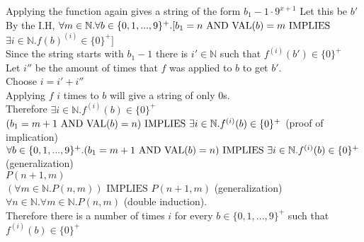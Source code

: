 \documentclass[11pt]{article}
\newcommand{\Implies}{\mbox{ IMPLIES }}
\newcommand{\And}{\mbox{ AND }}
\def\nats{{\mathbb N}}
\begin{document}
\begin{enumerate}
\begin{solution}
    \null\qquad\qquad Applying the function again gives a string of the form $b_1-1\cdot 9^{x+1}$ Let this be $b'$\\
    \null\qquad\qquad By the I.H, $\forall m\in\nats.\forall b\in\{0,1,...,9\}^+.[b_1 = n \And {\rm VAL}(b) = m\Implies$\\
    \null\qquad\qquad $\exists i\in\nats.f(b)^{(i)}\in\{0\}^+]$\\
    \null\qquad\qquad Since the string starts with $b_1-1$ there is $i'\in\nats$ such that $f^{(i)}(b') \in\{0\}^+$\\
    \null\qquad\qquad Let $i''$ be the amount of times that $f$ was applied to $b$ to get $b'$.\\
    \null\qquad\qquad Choose $i = i' + i''$\\
    \null\qquad\qquad Applying $f$ $i$ times to $b$ will give a string of only $0$s. \\
    \null\qquad\qquad Therefore $\exists i\in\nats.f^{(i)}(b)\in\{0\}^+$\\
    \null\qquad\quad $(b_1 = m+1 \And {\rm VAL}(b) = n)\Implies \exists i\in\nats.f^{(i)}(b)\in\{0\}^+$ (proof of implication)\\
    \null\qquad $\forall b\in\{0,1,...,9\}^+.(b_1 = m+1 \And {\rm VAL}(b) = n)\Implies \exists i\in\nats.f^{(i)}(b)\in\{0\}^+$ \\
    \null\qquad (generalization)\\
    \null\qquad $P(n+1,m)$\\
    \null\quad $(\forall m\in\nats.P(n, m)) \Implies P(n+1,m)$ (generalization)\\
    $\forall n\in\nats.\forall m\in\nats.P(n,m)$ (double induction).\\

    Therefore there is a number of times $i$ for every $b\in\{0,1,...,9\}^+$ such that $f^{(i)}(b)\in\{0\}^+$\\
\end{solution}
\end{enumerate}
\end{document}
